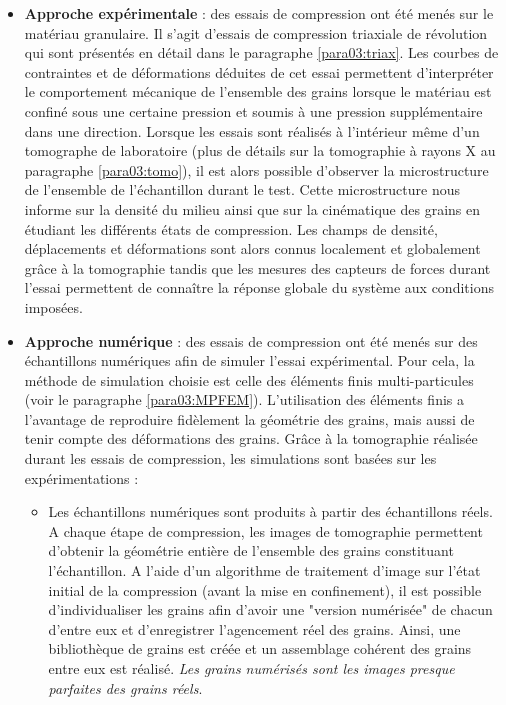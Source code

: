 \begin{itemize}
	\item \textbf{Approche expérimentale} : des essais de compression ont été menés sur le matériau granulaire. Il s'agit d'essais de compression triaxiale de révolution qui sont présentés en détail dans le paragraphe \ref{para03:triax}. Les courbes de contraintes et de déformations déduites de cet essai permettent d'interpréter le comportement mécanique de l'ensemble des grains lorsque le matériau est confiné sous une certaine pression et soumis à une pression supplémentaire dans une direction. Lorsque les essais sont réalisés à l'intérieur même d'un tomographe de laboratoire (plus de détails sur la tomographie à rayons X au paragraphe \ref{para03:tomo}), il est alors possible d'observer la microstructure de l'ensemble de l'échantillon durant le test. Cette microstructure nous informe sur la densité du milieu ainsi que sur la cinématique des grains en étudiant les différents états de compression. Les champs de densité, déplacements et déformations sont alors connus localement et globalement grâce à la tomographie tandis que les mesures des capteurs de forces durant l'essai permettent de connaître la réponse globale du système aux conditions imposées.
	\item \textbf{Approche numérique} : des essais de compression ont été menés sur des échantillons numériques afin de simuler l'essai expérimental. Pour cela, la méthode de simulation choisie est celle des éléments finis multi-particules (voir le paragraphe \ref{para03:MPFEM}). L'utilisation des éléments finis a l'avantage de reproduire fidèlement la géométrie des grains, mais aussi de tenir compte des déformations des grains. Grâce à la tomographie réalisée durant les essais de compression, les simulations sont basées sur les expérimentations :
	\begin{itemize}
		\item Les échantillons numériques sont produits à partir des échantillons réels. A chaque étape de compression, les images de tomographie permettent d'obtenir la géométrie entière de l'ensemble des grains constituant l'échantillon. A l'aide d'un algorithme de traitement d'image sur l'état initial de la compression (avant la mise en confinement), il est possible d'individualiser les grains afin d'avoir une "version numérisée" de chacun d'entre eux et d'enregistrer l'agencement réel des grains. Ainsi, une bibliothèque de grains est créée et un assemblage cohérent des grains entre eux est réalisé. \emph{Les grains numérisés sont les images presque parfaites des grains réels}.

\end{itemize}
\end{itemize}
